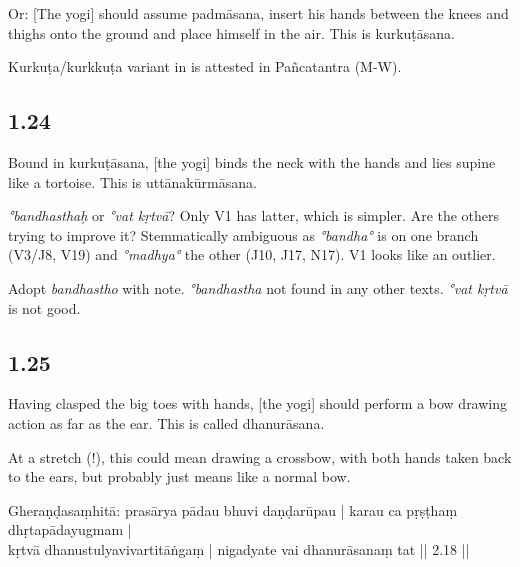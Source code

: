 \begin{ekdosis}
\begin{translation}[hp01_023]
Or: [The yogi] should assume padmāsana, insert his hands between the knees and thighs onto the ground and place himself in the air. This is kurkuṭāsana.
\end{translation}

\begin{philcomm}[hp01_023]
Kurkuṭa/kurkkuṭa variant in  is attested in Pañcatantra (M-W).
\end{philcomm}

\subsection*{1.24}
\begin{translation}[hp01_024]
Bound in kurkuṭāsana, [the yogi] binds the neck with the hands and lies supine like a tortoise. This is uttānakūrmāsana. 
\end{translation}

\begin{philcomm}[hp01_024]
\emph{°bandhasthaḥ} or \emph{°vat kṛtvā}? Only V1 has latter, which is simpler. Are the others trying to improve it? Stemmatically ambiguous as \emph{°bandha°} is on one branch (V3/J8, V19) and \emph{°madhya°} the other (J10, J17, N17). V1 looks like an outlier. 

Adopt \emph{bandhastho} with note. \emph{°bandhastha} not found in any other texts. \emph{°vat kṛtvā} is not good.
\end{philcomm}

\subsection*{1.25}
\begin{translation}[hp01_025]
Having clasped the big toes with hands, [the yogi] should perform a bow drawing action as far as the ear. This is called dhanurāsana.
\end{translation}

\begin{philcomm}[hp01_025]
At a stretch (!), this could mean drawing a crossbow, with both hands taken back to the ears, but probably just means like a normal bow.

Gheraṇḍasaṃhitā:
\startverse
 prasārya pādau bhuvi daṇḍarūpau |
 karau ca pṛṣṭhaṃ dhṛtapādayugmam |\\
 kṛtvā dhanustulyavivartitāṅgaṃ |
 nigadyate vai dhanurāsanaṃ tat || 2.18 ||
\endverse
\end{philcomm}


\end{ekdosis}
